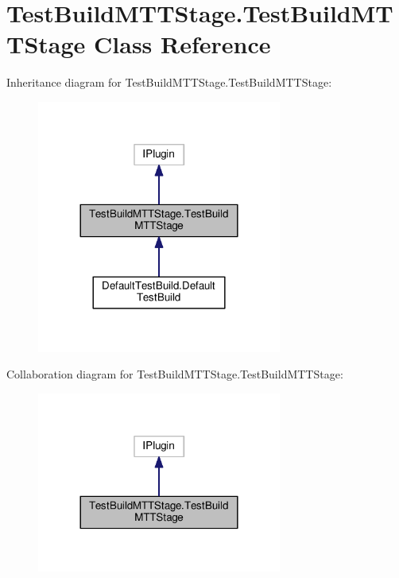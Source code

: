 \hypertarget{classTestBuildMTTStage_1_1TestBuildMTTStage}{\section{Test\-Build\-M\-T\-T\-Stage.\-Test\-Build\-M\-T\-T\-Stage Class Reference}
\label{classTestBuildMTTStage_1_1TestBuildMTTStage}
}


Inheritance diagram for Test\-Build\-M\-T\-T\-Stage.\-Test\-Build\-M\-T\-T\-Stage\-:
\nopagebreak
\begin{figure}[H]
\begin{center}
\leavevmode
\includegraphics[width=228pt]{classTestBuildMTTStage_1_1TestBuildMTTStage__inherit__graph}
\end{center}
\end{figure}


Collaboration diagram for Test\-Build\-M\-T\-T\-Stage.\-Test\-Build\-M\-T\-T\-Stage\-:
\nopagebreak
\begin{figure}[H]
\begin{center}
\leavevmode
\includegraphics[width=228pt]{classTestBuildMTTStage_1_1TestBuildMTTStage__coll__graph}
\end{center}
\end{figure}
